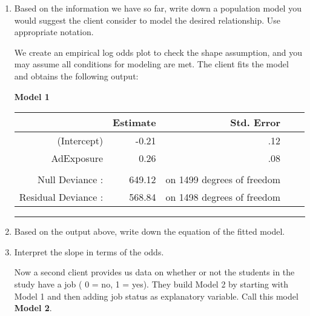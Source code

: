 \documentclass[11pt]{article}
\begin{document}
\begin{enumerate}

\item Based on the information we have so far, write down a population model you would suggest the client consider to model the desired relationship. Use appropriate notation. 



\pagebreak


We create an empirical log odds plot to check the shape assumption, and you may assume all conditions for modeling are met. The client fits the model and obtains the following output: 

\textbf{Model 1} 

\begin{center}
\begin{tabular}{rrrrr}
  \hline
             & Estimate & Std. Error \\
  \hline
(Intercept)    & -0.21 & .12    \\
 AdExposure    & 0.26 & .08 \\
  \hline
  & & \\ 
  Null Deviance : & 649.12 &  on 1499 degrees of freedom \\
  Residual Deviance : & 568.84 &   on 1498 degrees of freedom \\
\end{tabular}
\end{center}

\rule{\textwidth}{1pt}

\item Based on the output above, write down the equation of the fitted model. 



\vspace{5cm} 


\item Interpret the slope in terms of the odds. 


\pagebreak





Now a second client provides us data on whether or not the students in the study have a job ( 0 = no, 1 = yes). They build Model 2 by starting with Model 1 and then adding job status as explanatory variable. Call this model \textbf{Model 2}. 


\end{enumerate}
\end{document}
